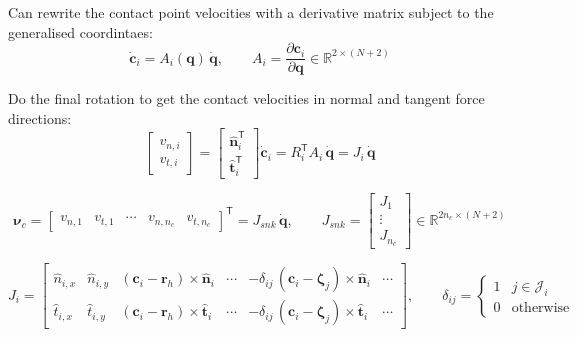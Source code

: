 Can rewrite the contact point velocities with a derivative matrix subject to the generalised coordintaes:
\begin{equation}
  \dot{\mathbf c}_i = A_i(\mathbf q)\,\dot{\mathbf q},
  \qquad
  A_i = \frac{\partial \mathbf c_i}{\partial \mathbf q} \in \mathbb R^{2\times(N+2)}
  \label{eq:pos-jac}
\end{equation}

Do the final rotation to get the contact velocities in normal and tangent force directions:
\begin{equation}
  \begin{bmatrix} v_{n,i} \\ v_{t,i} \end{bmatrix}
  = \begin{bmatrix} \hat{\mathbf n}_i^\mathsf{T} \\ \hat{\mathbf t}_i^\mathsf{T} \end{bmatrix} \dot{\mathbf c}_i
  = R_i^\mathsf{T} A_i\, \dot{\mathbf q}
  = J_i\, \dot{\mathbf q}
  \label{eq:contact-frame-vel}
\end{equation}
 
\begin{equation}
  \boldsymbol\nu_c =
  \begin{bmatrix} v_{n,1} & v_{t,1} & \cdots & v_{n,n_c} & v_{t,n_c} \end{bmatrix}^\mathsf{T}
  = J_{snk}\, \dot{\mathbf q},
  \qquad
  J_{snk} = \begin{bmatrix} J_1 \\ \vdots \\ J_{n_c} \end{bmatrix} \in \mathbb R^{2n_c \times (N+2)}
  \label{eq:Jsnk}
\end{equation}
 
\begin{equation}
  J_i =
  \begin{bmatrix}
    \hat n_{i,x} & \hat n_{i,y} & (\mathbf c_i - \mathbf r_h)\times\hat{\mathbf n}_i & \cdots & -\delta_{ij}\,(\mathbf c_i - \boldsymbol\zeta_j)\times\hat{\mathbf n}_i & \cdots \\[2pt]
    \hat t_{i,x} & \hat t_{i,y} & (\mathbf c_i - \mathbf r_h)\times\hat{\mathbf t}_i & \cdots & -\delta_{ij}\,(\mathbf c_i - \boldsymbol\zeta_j)\times\hat{\mathbf t}_i & \cdots
  \end{bmatrix},
  \qquad
  \delta_{ij} =
  \begin{cases}
    1 & j \in \mathcal J_i \\
    0 & \text{otherwise}
  \end{cases}
  \label{eq:Ji-entries}
\end{equation}
 

